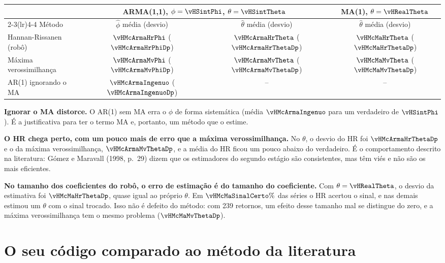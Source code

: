 \documentclass[11pt,a4paper]{article}
\begin{document}
\begin{center}\small
\begin{tabular}{l c c c}
\toprule
& \multicolumn{2}{c}{ARMA(1,1), $\phi = \vHSintPhi$, $\theta = \vHSintTheta$} & MA(1), $\theta = \vHRealTheta$\\
\cmidrule(lr){2-3}\cmidrule(lr){4-4}
Método & $\hat\phi$ média (desvio) & $\hat\theta$ média (desvio) & $\hat\theta$ média (desvio)\\
\midrule
Hannan-Rissanen (robô) & $\vHMcArmaHrPhi$ ($\vHMcArmaHrPhiDp$) & $\vHMcArmaHrTheta$ ($\vHMcArmaHrThetaDp$) & $\vHMcMaHrTheta$ ($\vHMcMaHrThetaDp$)\\
Máxima verossimilhança & $\vHMcArmaMvPhi$ ($\vHMcArmaMvPhiDp$) & $\vHMcArmaMvTheta$ ($\vHMcArmaMvThetaDp$) & $\vHMcMaMvTheta$ ($\vHMcMaMvThetaDp$)\\
AR(1) ignorando o MA & $\vHMcArmaIngenuo$ ($\vHMcArmaIngenuoDp$) & -- & --\\
\bottomrule
\end{tabular}
\end{center}

\textbf{Ignorar o MA distorce.} O AR(1) sem MA erra o $\phi$ de forma sistemática (média $\vHMcArmaIngenuo$ para um verdadeiro
de $\vHSintPhi$). É a justificativa para ter o termo MA e, portanto, um método que o estime.

\textbf{O HR chega perto, com um pouco mais de erro que a máxima verossimilhança.} No $\theta$, o desvio do HR foi
$\vHMcArmaHrThetaDp$ e o da máxima verossimilhança, $\vHMcArmaMvThetaDp$, e a média do HR ficou um pouco abaixo do verdadeiro.
É o comportamento descrito na literatura: Gómez e Maravall (1998, p.~29) dizem que os estimadores do segundo estágio
são consistentes, mas têm viés e não são os mais eficientes.

\textbf{No tamanho dos coeficientes do robô, o erro de estimação é do tamanho do coeficiente.} Com $\theta = \vHRealTheta$, o
desvio da estimativa foi $\vHMcMaHrThetaDp$, quase igual ao próprio $\theta$. Em $\vHMcMaSinalCerto\%$ das séries o HR acertou o
sinal, e nas demais estimou um $\theta$ com o sinal trocado. Isso não é defeito do método: com 239 retornos, um efeito
desse tamanho mal se distingue do zero, e a máxima verossimilhança tem o mesmo problema ($\vHMcMaMvThetaDp$).

\section{O seu código comparado ao método da literatura}\label{sec:literatura}
\end{document}
